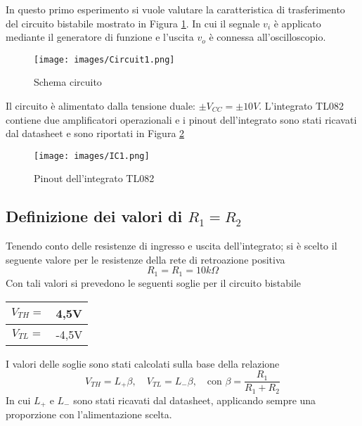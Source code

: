 In questo primo esperimento si vuole valutare la caratteristica di trasferimento del circuito bistabile mostrato in Figura \ref{fig:Circuit1}. In cui il segnale $v_i$ è applicato mediante il generatore di funzione e l'uscita $v_o$ è connessa all'oscilloscopio.
\begin{figure}[H]
    \centering
    \texttt{[image: images/Circuit1.png]}
    \caption{Schema circuito}
    \label{fig:Circuit1}
\end{figure}
Il circuito è alimentato dalla tensione duale: $\pm V_{CC}=\pm 10V$. L'integrato TL082 contiene due amplificatori operazionali e i pinout dell'integrato sono stati ricavati dal datasheet e sono riportati in Figura \ref{fig:IC1}
\begin{figure}[H]
    \centering
    \texttt{[image: images/IC1.png]}
    \caption{Pinout dell'integrato TL082}
    \label{fig:IC1}
\end{figure}
\subsection{Definizione dei valori di $R_1=R_2$}
Tenendo conto delle resistenze di ingresso e uscita dell'integrato; si è scelto il seguente valore per le resistenze della rete di retroazione positiva
\begin{equation*}
    R_1=R_1=10k\Omega
\end{equation*}
Con tali valori si prevedono le seguenti soglie per il circuito bistabile
\begin{table}[H]
    \centering
    \begin{tabular}{|c|c|}
        \hline
        $V_{TH}=$&4,5V \\\hline
        $V_{TL}=$&-4,5V \\\hline
    \end{tabular}
\end{table}
I valori delle soglie sono stati calcolati sulla base della relazione
\begin{equation}
    V_{TH}=L_{+}\beta,\quad V_{TL}=L_{-}\beta,\quad\text{con }\beta=\frac{R_1}{R_1+R_2}
\end{equation}
In cui $L_{+}\text{ e }L_{-}$ sono stati ricavati dal datasheet, applicando sempre una proporzione con l'alimentazione scelta.
